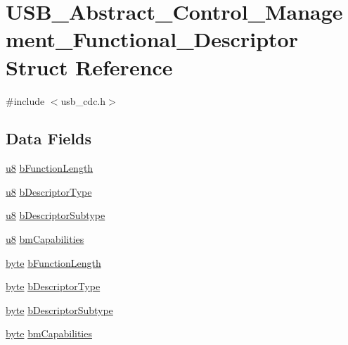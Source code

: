 \hypertarget{struct_u_s_b___abstract___control___management___functional___descriptor}{\section{U\-S\-B\-\_\-\-Abstract\-\_\-\-Control\-\_\-\-Management\-\_\-\-Functional\-\_\-\-Descriptor Struct Reference}
\label{struct_u_s_b___abstract___control___management___functional___descriptor}
}


{\ttfamily \#include $<$usb\-\_\-cdc.\-h$>$}

\subsection*{Data Fields}
\begin{DoxyCompactItemize}
\item 
\hyperlink{p8_2pinguino_2core_2typedef_8h_aed742c436da53c1080638ce6ef7d13de}{u8} \hyperlink{struct_u_s_b___abstract___control___management___functional___descriptor_a26c0bc44674a4154a958ce07a0d5b0fd}{b\-Function\-Length}
\item 
\hyperlink{p8_2pinguino_2core_2typedef_8h_aed742c436da53c1080638ce6ef7d13de}{u8} \hyperlink{struct_u_s_b___abstract___control___management___functional___descriptor_af6d6c7e334878414c973fc10e54cfb4e}{b\-Descriptor\-Type}
\item 
\hyperlink{p8_2pinguino_2core_2typedef_8h_aed742c436da53c1080638ce6ef7d13de}{u8} \hyperlink{struct_u_s_b___abstract___control___management___functional___descriptor_a647561cc46bc5a0d3e0d9e962c43c605}{b\-Descriptor\-Subtype}
\item 
\hyperlink{p8_2pinguino_2core_2typedef_8h_aed742c436da53c1080638ce6ef7d13de}{u8} \hyperlink{struct_u_s_b___abstract___control___management___functional___descriptor_a9ad7ca27543639baeed1b53c6f24e149}{bm\-Capabilities}
\item 
\hyperlink{p8_2pinguino_2core_2typedef_8h_a0c8186d9b9b7880309c27230bbb5e69d}{byte} \hyperlink{struct_u_s_b___abstract___control___management___functional___descriptor_a2d45c545dca79b1a912a7fa0e8d3a691}{b\-Function\-Length}
\item 
\hyperlink{p8_2pinguino_2core_2typedef_8h_a0c8186d9b9b7880309c27230bbb5e69d}{byte} \hyperlink{struct_u_s_b___abstract___control___management___functional___descriptor_a0b4dacbe8b9cc6e176f298a4fe7bbd39}{b\-Descriptor\-Type}
\item 
\hyperlink{p8_2pinguino_2core_2typedef_8h_a0c8186d9b9b7880309c27230bbb5e69d}{byte} \hyperlink{struct_u_s_b___abstract___control___management___functional___descriptor_a8ad9638618bb89c49f9c1490311ab1d5}{b\-Descriptor\-Subtype}
\item 
\hyperlink{p8_2pinguino_2core_2typedef_8h_a0c8186d9b9b7880309c27230bbb5e69d}{byte} \hyperlink{struct_u_s_b___abstract___control___management___functional___descriptor_af402fe1fda6ed7e80071146e003be43e}{bm\-Capabilities}
\end{DoxyCompactItemize}


